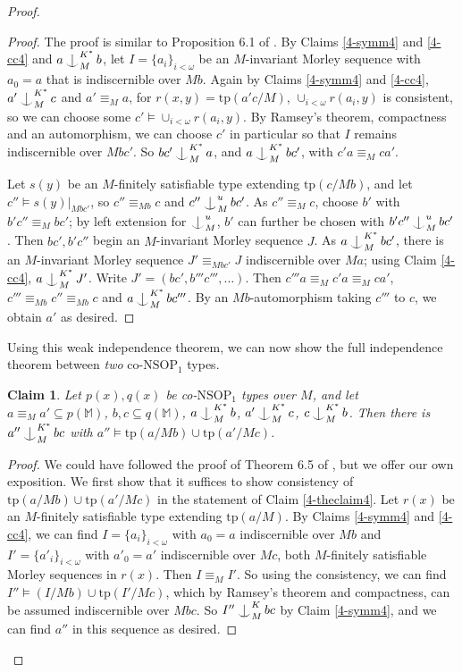 \documentclass[12pt]{amsart}
\newtheorem{claim}[theorem]{Claim}
\theoremstyle{definition}
\def\Ind#1#2{#1\setbox0=\hbox{$#1x$}\kern\wd0\hbox to 0pt{\hss$#1\mid$\hss}
\lower.9\ht0\hbox to 0pt{\hss$#1\smile$\hss}\kern\wd0}
\def\ind{\mathop{\mathpalette\Ind{}}}
\begin{document}
\begin{proof}
\begin{proof}
    The proof is similar to Proposition 6.1 of \cite{KR17}. By Claims \ref{4-symm4} and \ref{4-cc4} and $a \ind^{K^{*}}_{M} b$, let $I = \{a_{i}\}_{i < \omega}$ be an $M$-invariant Morley sequence with $a_{0} =a$ that is indiscernible over $Mb$. Again by Claims \ref{4-symm4} and \ref{4-cc4}, $a' \ind^{K^{*}}_{M} c$ and $a' \equiv_{M} a$, for $r(x, y) = \mathrm{tp}(a' c/M)$, $\cup_{i < \omega} r(a_{i}, y)$ is consistent, so we can choose some $c' \models \cup_{i < \omega} r(a_{i}, y) $. By Ramsey's theorem, compactness and an automorphism, we can choose $c'$ in particular so that $I$ remains indiscernible over $Mbc'$. So $bc' \ind_{M}^{K^{*}} a$, and $a \ind_{M}^{K^{*}} bc'$, with $c'a \equiv_{M} ca'$.

Let $s(y)$ be an $M$-finitely satisfiable type extending $\mathrm{tp}(c/Mb)$, and let $c'' \models s(y)|_{Mbc'}$, so $c'' \equiv_{Mb} c$ and $c''\ind_{M}^{u} bc'$. As $c'' \equiv_{M} c$, choose $b'$ with $b'c'' \equiv_{M} bc'$; by left extension for $\ind_{M}^{u}$, $b'$ can further be chosen with $b'c''\ind_{M}^{u} bc'$. Then $bc', b'c''$ begin an $M$-invariant Morley sequence $J$. As $a \ind_{M}^{K^{*}} bc'$, there is an $M$-invariant Morley sequence $J' \equiv_{Mbc'} J$ indiscernible over $Ma$; using Claim \ref{4-cc4}, $a \ind_{M}^{K^{*}} J'$. Write $J'=(bc', b'''c''', \ldots)$. Then $c''' a\equiv_{M} c'a \equiv_{M} ca'$, $c''' \equiv_{Mb} c'' \equiv_{Mb} c$ and $a \ind_{M}^{K^{*}}bc'''$. By an $Mb$-automorphism taking $c'''$ to $c$, we obtain $a'$ as desired.

\end{proof}


Using this weak independence theorem, we can now show the full independence theorem between \textit{two} co-$\mathrm{NSOP}_{1}$ types.

\begin{claim}\label{4-ind4}
 Let $p(x), q(x)$ be co-$\mathrm{NSOP}_{1}$ types over $M$, and let $a \equiv_{M} a' \subseteq p(\mathbb{M})$, $b, c \subseteq q(\mathbb{M})$, $a \ind^{K^{*}}_{M} b$, $a' \ind^{K^{*}}_{M} c$, $c \ind^{K^{*}}_{M} b$. Then there is $a'' \ind_{M}^{K^{*}} bc$  with $a'' \models \mathrm{tp}(a/Mb) \cup \mathrm{tp}(a'/Mc)$. 
\end{claim}

\begin{proof}
We could have followed the proof of Theorem 6.5 of \cite{KR17}, but we offer our own exposition. We first show that it suffices to show consistency of $\mathrm{tp}(a/Mb) \cup \mathrm{tp}(a'/Mc)$ in the statement of Claim \ref{4-theclaim4}. Let $r(x)$ be an $M$-finitely satisfiable type extending $\mathrm{tp}(a/M)$. By Claims \ref{4-symm4} and \ref{4-cc4}, we can find $I= \{a_{i}\}_{i < \omega}$ with $a_{0} =a$ indiscernible over $Mb$ and $I'= \{a'_{i}\}_{i < \omega}$ with $a'_{0} =a'$ indiscernible over $Mc$, both $M$-finitely satisfiable Morley sequences in $r(x)$. Then $I \equiv_{M} I'$. So using the consistency, we can find $I'' \models (I/Mb) \cup \mathrm{tp}(I'/Mc)$, which by Ramsey's theorem and compactness, can be assumed indiscernible over $Mbc$. So $I'' \ind^{K}_{M} bc$ by Claim \ref{4-symm4}, and we can find $a''$ in this sequence as desired.


\end{proof}
\end{proof}
\end{document}
